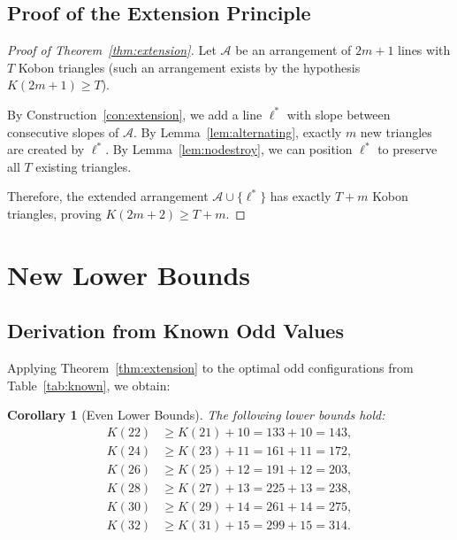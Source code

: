 \documentclass[11pt,a4paper]{article}
\theoremstyle{plain}
\newtheorem{corollary}[theorem]{Corollary}
\theoremstyle{definition}
\theoremstyle{remark}
\newcommand{\K}{K}
\begin{document}
\subsection{Proof of the Extension Principle}

\begin{proof}[Proof of Theorem~\ref{thm:extension}]
Let $\mathcal{A}$ be an arrangement of $2m+1$ lines with $T$ Kobon triangles (such an arrangement exists by the hypothesis $\K(2m+1) \geq T$).

By Construction~\ref{con:extension}, we add a line $\ell^*$ with slope between consecutive slopes of $\mathcal{A}$. By Lemma~\ref{lem:alternating}, exactly $m$ new triangles are created by $\ell^*$. By Lemma~\ref{lem:nodestroy}, we can position $\ell^*$ to preserve all $T$ existing triangles.

Therefore, the extended arrangement $\mathcal{A} \cup \{\ell^*\}$ has exactly $T + m$ Kobon triangles, proving $\K(2m+2) \geq T + m$.
\end{proof}

\section{New Lower Bounds}

\subsection{Derivation from Known Odd Values}

Applying Theorem~\ref{thm:extension} to the optimal odd configurations from Table~\ref{tab:known}, we obtain:

\begin{corollary}[Even Lower Bounds]
\label{cor:even}
The following lower bounds hold:
\begin{align}
\K(22) &\geq \K(21) + 10 = 133 + 10 = 143, \label{eq:k22} \\
\K(24) &\geq \K(23) + 11 = 161 + 11 = 172, \label{eq:k24} \\
\K(26) &\geq \K(25) + 12 = 191 + 12 = 203, \label{eq:k26} \\
\K(28) &\geq \K(27) + 13 = 225 + 13 = 238, \label{eq:k28} \\
\K(30) &\geq \K(29) + 14 = 261 + 14 = 275, \label{eq:k30} \\
\K(32) &\geq \K(31) + 15 = 299 + 15 = 314. \label{eq:k32}
\end{align}
\end{corollary}
\end{document}
